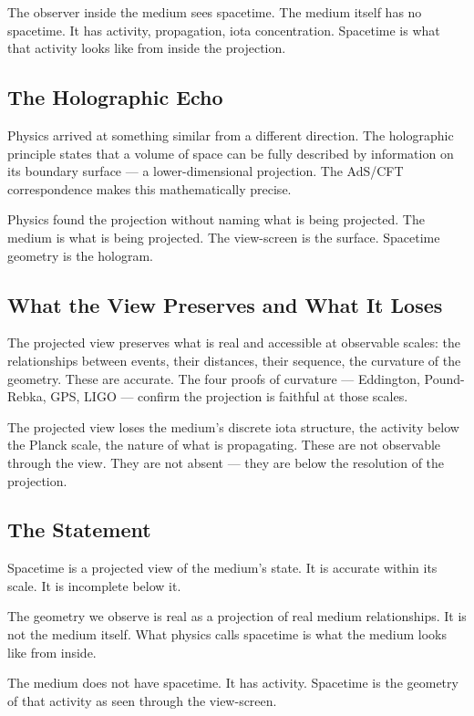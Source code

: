 \documentclass[11pt]{article}
\begin{document}
The observer inside the medium sees spacetime. The medium itself has no
spacetime. It has activity, propagation, iota concentration. Spacetime is what
that activity looks like from inside the projection.

\subsection{The Holographic Echo}
\label{sec:orgf9fbd19}

Physics arrived at something similar from a different direction. The holographic
principle states that a volume of space can be fully described by information on
its boundary surface — a lower-dimensional projection. The AdS/CFT correspondence
makes this mathematically precise.

Physics found the projection without naming what is being projected. The medium
is what is being projected. The view-screen is the surface. Spacetime geometry is
the hologram.

\subsection{What the View Preserves and What It Loses}
\label{sec:org44e4af2}

The projected view preserves what is real and accessible at observable scales:
the relationships between events, their distances, their sequence, the curvature
of the geometry. These are accurate. The four proofs of curvature — Eddington,
Pound-Rebka, GPS, LIGO — confirm the projection is faithful at those scales.

The projected view loses the medium's discrete iota structure, the activity below
the Planck scale, the nature of what is propagating. These are not observable
through the view. They are not absent — they are below the resolution of the
projection.

\subsection{The Statement}
\label{sec:orge9fe9df}

Spacetime is a projected view of the medium's state. It is accurate within its
scale. It is incomplete below it.

The geometry we observe is real as a projection of real medium relationships. It
is not the medium itself. What physics calls spacetime is what the medium looks
like from inside.

The medium does not have spacetime. It has activity. Spacetime is the geometry
of that activity as seen through the view-screen.
\end{document}
